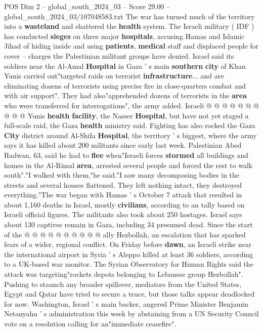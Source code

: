\begin{textsample}{POS Dim 2 – global\_south\_2024\_03 – Score 29.00 – global\_south\_2024\_03/107048583.txt}
The war has turned much of the territory into a \textbf{wasteland} and shattered the \textbf{health} system.
The Israeli military ( IDF ) has conducted \textbf{sieges} on three major \textbf{hospitals}, accusing Hamas and Islamic Jihad of hiding inside and using \textbf{patients}, \textbf{medical} staff and displaced people for cover -- charges the Palestinian militant groups have denied.
Israel said its soldiers near the Al-Amal \textbf{Hospital} in Gaza ' s main \textbf{southern} \textbf{city} of Khan Yunis carried out"targeted raids on terrorist \textbf{infrastructure}... and are eliminating dozens of terrorists using precise fire in close-quarters combat and with air support".
They had also"apprehended dozens of terrorists in the \textbf{area} who were transferred for interrogations", the army added.
Israeli @ @ @ @ @ @ @ @ @ @ Yunis \textbf{health} \textbf{facility}, the Nasser \textbf{Hospital}, but have not yet staged a full-scale raid, the Gaza \textbf{health} ministry said.
Fighting has also rocked the Gaza \textbf{City} district around Al-Shifa \textbf{Hospital}, the territory ' s biggest, where the army says it has killed about 200 militants since early last week.
Palestinian Abed Radwan, 63, said he had to \textbf{flee} when"Israeli forces \textbf{stormed} all buildings and homes in the Al-Rimal \textbf{area}, arrested several people and forced the rest to walk south"."I walked with them,"he said."I saw many decomposing bodies in the streets and several houses flattened.
They left nothing intact, they destroyed everything."The war began with Hamas ' s October 7 attack that resulted in about 1,160 deaths in Israel, mostly \textbf{civilians}, according to an tally based on Israeli official figures.
The militants also took about 250 hostages.
Israel says about 130 captives remain in Gaza, including 34 presumed dead.
Since the start of the @ @ @ @ @ @ @ @ @ @ ally Hezbollah, an escalation that has sparked fears of a wider, regional conflict.
On Friday before \textbf{dawn}, an Israeli strike near the international airport in Syria ' s Aleppo killed at least 36 soldiers, according to a UK-based war monitor.
The Syrian Observatory for Human Rights said the attack was targeting"rockets depots belonging to Lebanese group Hezbollah".
Pushing to staunch any broader spillover, mediators from the United States, Egypt and Qatar have tried to secure a truce, but those talks appear deadlocked for now.
Washington, Israel ' s main backer, angered Prime Minister Benjamin Netanyahu ' s administration this week by abstaining from a UN Security Council vote on a resolution calling for an"immediate ceasefire".

\end{textsample}
